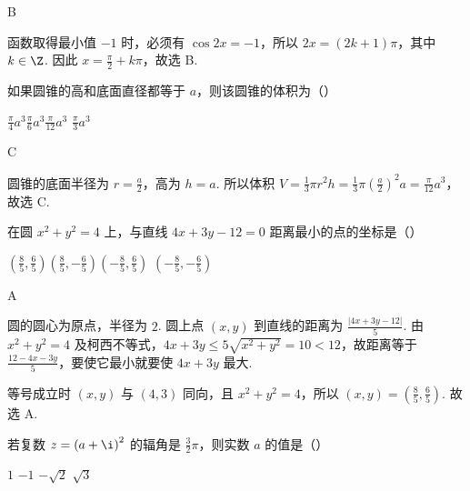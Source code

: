 \documentclass[UTF8,a4paper,oneside,11pt]{ctexbook}
\begin{document}
\begin{answer}
B
\end{answer}

\begin{solution}
函数取得最小值 \(-1\) 时，必须有 \(\cos 2x=-1\)，所以 \(2x=(2k+1)\pi\)，其中 \(k\in\Z\). 因此 \(x=\frac{\pi}{2}+k\pi\)，故选 B.
\end{solution}

\begin{problem}

如果圆锥的高和底面直径都等于 \(a\)，则该圆锥的体积为（\quad）

\choices
{\(\frac{\pi}{4}a^{3} \)}{\(\frac{\pi}{6}a^{3} \)}{\(\frac{\pi}
{12}a^{3} \)}
{\(\frac{\pi}
{3}a^{3} \)}
\end{problem}

\begin{answer}
C
\end{answer}

\begin{solution}
圆锥的底面半径为 \(r=\frac{a}{2}\)，高为 \(h=a\). 所以体积
\(V=\frac{1}{3}\pi r^{2}h=\frac{1}{3}\pi\left(\frac{a}{2}\right)^{2}a=\frac{\pi}{12}a^{3}\)，故选 C.
\end{solution}

\begin{problem}

在圆 \(x^{2} + y^{2} = 4 \) 上，与直线 \(4x + 3y - 12 = 0 \) 距离最小的点的坐标是（\quad）

\choices
{\(\left(\frac{8}{5},\frac{6}{5}\right) \)}{\(\left(\frac{8}{5},-\frac{6}{5}\right) \)}{\(\left(-\frac{8}{5},\frac{6}{5}\right) \)}
{\(\left(-\frac{8}
{5},-\frac{6}
{5}\right) \)}
\end{problem}

\begin{answer}
A
\end{answer}

\begin{solution}
圆的圆心为原点，半径为 \(2\). 圆上点 \((x,y)\) 到直线的距离为
\(\frac{|4x+3y-12|}{5}\). 由 \(x^{2}+y^{2}=4\) 及柯西不等式，\(4x+3y\leqslant5\sqrt{x^{2}+y^{2}}=10<12\)，故距离等于 \(\frac{12-4x-3y}{5}\)，要使它最小就要使 \(4x+3y\) 最大.

等号成立时 \((x,y)\) 与 \((4,3)\) 同向，且 \(x^{2}+y^{2}=4\)，所以 \((x,y)=\left(\frac{8}{5},\frac{6}{5}\right)\). 故选 A.
\end{solution}

\begin{problem}

若复数 \(z = \left(a + \i \right)^2 \) 的辐角是 \(\frac{3}{2} \pi \)，则实数 \(a \) 的值是（\quad）

\choices
{\(1\)}
{\(-1\)}
{\(-\sqrt{2} \)}
{\(\sqrt{3} \)}
\end{problem}
\end{document}

